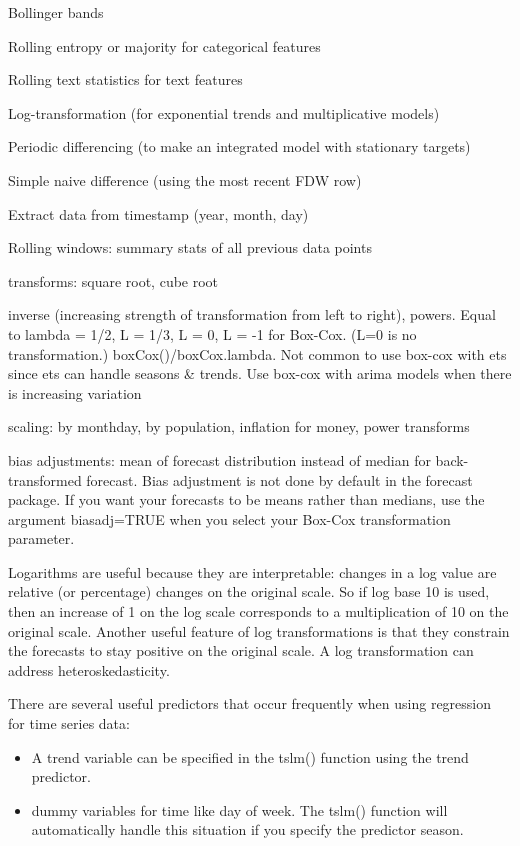 \documentclass[]{book}
\begin{document}
Bollinger bands

Rolling entropy or majority for categorical features

Rolling text statistics for text features

Log-transformation (for exponential trends and multiplicative models)

Periodic differencing (to make an integrated model with stationary targets)

Simple naive difference (using the most recent FDW row)

Extract data from timestamp (year, month, day)

Rolling windows: summary stats of all previous data points

transforms: square root, cube root

inverse (increasing strength of transformation from left to right), powers. Equal to lambda = 1/2, L = 1/3, L = 0, L = -1 for Box-Cox. (L=0 is no transformation.) boxCox()/boxCox.lambda. Not common to use box-cox with ets since ets can handle seasons \& trends. Use box-cox with arima models when there is increasing variation

scaling: by monthday, by population, inflation for money, power transforms

bias adjustments: mean of forecast distribution instead of median for back-transformed forecast. Bias adjustment is not done by default in the forecast package. If you want your forecasts to be means rather than medians, use the argument biasadj=TRUE when you select your Box-Cox transformation parameter.

Logarithms are useful because they are interpretable: changes in a log value are relative (or percentage) changes on the original scale. So if log base 10 is used, then an increase of 1 on the log scale corresponds to a multiplication of 10 on the original scale. Another useful feature of log transformations is that they constrain the forecasts to stay positive on the original scale. A log transformation can address heteroskedasticity.

There are several useful predictors that occur frequently when using regression for time series data:

\begin{itemize}
\item
  A trend variable can be specified in the tslm() function using the trend predictor.
\item
  dummy variables for time like day of week. The tslm() function will automatically handle this situation if you specify the predictor season.
\end{itemize}
\end{document}
